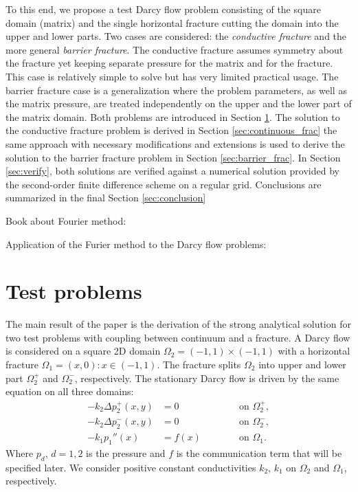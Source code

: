 \documentclass{elsarticle}
\def\Laplace{\Delta}
\begin{document}
To this end, we propose a test Darcy flow problem consisting of the square domain (matrix) and the single horizontal fracture 
cutting the domain into the upper and lower parts.  
Two cases are considered: the {\it conductive fracture} and the more general {\it barrier fracture}.
The conductive fracture assumes symmetry about the fracture yet keeping separate pressure for the matrix and for the fracture. 
This case is relatively simple to solve but has very limited practical usage.
The barrier fracture case is a generalization where the problem parameters, as well as the matrix pressure, are treated independently on
 the upper and the lower part of the matrix domain. Both problems are introduced in Section \ref{sec:setting}.
The solution to the conductive fracture problem is derived in Section \ref{sec:continuous_frac} the same approach with necessary modifications and extensions
is used to derive the solution to the barrier fracture problem in Section \ref{sec:barrier_frac}. In Section \ref{sec:verify}, 
both solutions are verified against a numerical solution provided by the second-order finite difference scheme on a regular grid. 
Conclusions are summarized in the final Section \ref{sec:conclusion} 


Book about Fourier method:
\cite{Brown1993}

Application of the Furier method to the Darcy flow problems: \cite{Onder1998}


\section{Test problems}
\label{sec:setting}
The main result of the paper is the derivation of the strong analytical solution for two test problems with coupling between continuum and a fracture.
A Darcy flow is considered  on a square 2D domain $\Omega_2 = (-1,1)\times(-1,1)$
with a horizontal fracture $\Omega_1 = { (x,0) : x\in (-1,1)}$. The fracture splits $\Omega_2$ into upper and 
lower part $\Omega_2^+$ and $\Omega_2^-$, respectively.
The stationary Darcy flow is driven by the same equation on all three domains:
\begin{align}
  \label{eq:Darcy_common}
  -k_2 \Laplace p^+_2(x,y) &= 0 \qquad &&\text{ on }\Omega_2^+,\\
  -k_2 \Laplace p^-_2(x,y) &= 0 \qquad &&\text{ on }\Omega_2^-,\\
  -k_1 p_1''(x) &= f(x) \qquad &&\text{ on }\Omega_1.
  \label{eq:Darcy_common_c}
\end{align}
Where $p_d$, $d=1,2$ is the pressure and $f$ is the communication term that will be specified later. 
We consider positive constant conductivities $k_2$, $k_1$ on $\Omega_2$ and $\Omega_1$, respectively.
\end{document}
